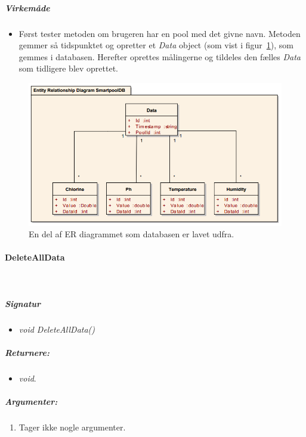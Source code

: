 \subparagraph{Virkemåde}
\begin{itemize}
	\item Først tester metoden om brugeren har en pool med det givne navn. Metoden gemmer så tidspunktet og opretter et \textit{Data} object (som vist i figur~\ref{fig:datasetentity}), som gemmes i databasen. Herefter oprettes målingerne og tildeles den fælles \textit{Data} som tidligere blev oprettet.
\end{itemize}

\begin{figure}
\centering
\includegraphics[width=0.8\linewidth]{figs/implementering/datasetentity.png}
\caption{En del af ER diagrammet som databasen er lavet udfra.}
\label{fig:datasetentity}
\end{figure}






\paragraph{DeleteAllData}\ %







\subparagraph{Signatur}
\begin{itemize}
	\item \textit{void DeleteAllData()}
\end{itemize}

\subparagraph{Returnere:}
\begin{itemize}
	\item \textit{void}.
\end{itemize}

\subparagraph{Argumenter:}
\begin{enumerate}
	\item Tager ikke nogle argumenter.
\end{enumerate}

